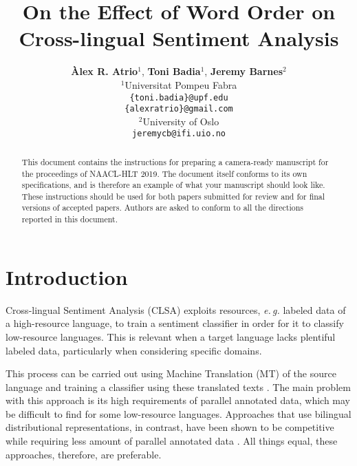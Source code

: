 \documentclass[11pt,a4paper]{article}
\title{On the Effect of Word Order on Cross-lingual Sentiment Analysis}
\author {\textbf{Àlex R. Atrio$^1$}, \textbf{Toni Badia$^{1}$}, \textbf{Jeremy Barnes$^{2}$}\\[5pt]
$^1$Universitat Pompeu Fabra\\
{\tt \{toni.badia\}@upf.edu} \\[5pt]
{\tt \{alexratrio\}@gmail.com} \\[5pt]
$^2$University of Oslo\\
{\tt jeremycb@ifi.uio.no}
}
\date{}
\newcommand{\eg}{\textit{e.\,g.}\xspace}
\begin{document}
\maketitle
\begin{abstract}
  This document contains the instructions for preparing a camera-ready
  manuscript for the proceedings of NAACL-HLT 2019. The document itself
  conforms to its own specifications, and is therefore an example of
  what your manuscript should look like. These instructions should be
  used for both papers submitted for review and for final versions of
  accepted papers.  Authors are asked to conform to all the directions
  reported in this document.
\end{abstract}


\section{Introduction}




Cross-lingual Sentiment Analysis (CLSA) exploits resources, \eg labeled data of a high-resource language, to train a sentiment classifier in order for it to classify low-resource languages. This is relevant when a target language lacks plentiful labeled data, particularly when considering specific domains. 

This process can be carried out using Machine Translation (MT) of the source language and training a classifier using these translated texts \cite{Banea2008,Balahur2014d}. The main problem with this approach is its high requirements of parallel annotated data, which may be difficult to find for some low-resource languages. Approaches that use bilingual distributional representations, in contrast, have been shown to be competitive while requiring less amount of parallel annotated data \cite{Chen2016,Barnes2018b}. All things equal, these approaches, therefore, are preferable.
\end{document}
